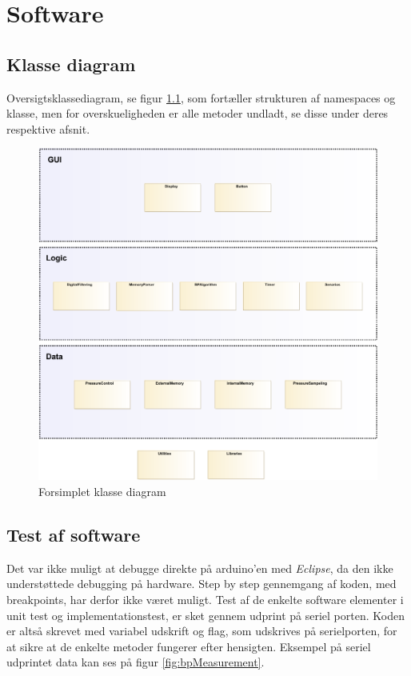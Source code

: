 \chapter{Software}

\section{Klasse diagram}
Oversigtsklassediagram, se figur \ref{fig:classDiagramSimple}, som fortæller strukturen af namespaces og klasse, men for overskueligheden er alle metoder undladt, se disse under deres respektive afsnit.
\begin{figure}[H]
	\includegraphics[width=\textwidth]{Implementeringsdokument/klassediagram_forsimplet-crop.pdf}
	\caption{Forsimplet klasse diagram}\label{fig:classDiagramSimple}
\end{figure}
\newpage









\section{Test af software}
Det var ikke muligt at debugge direkte på arduino'en med \textit{Eclipse}, da den ikke understøttede debugging på hardware. Step by step gennemgang af koden, med breakpoints, har derfor ikke været muligt. Test af de enkelte software elementer i unit test og implementationstest, er sket gennem udprint på seriel porten. Koden er altså skrevet med variabel udskrift og flag, som udskrives på serielporten, for at sikre at de enkelte metoder fungerer efter hensigten. Eksempel på seriel udprintet data kan ses på figur \ref{fig:bpMeasurement}.